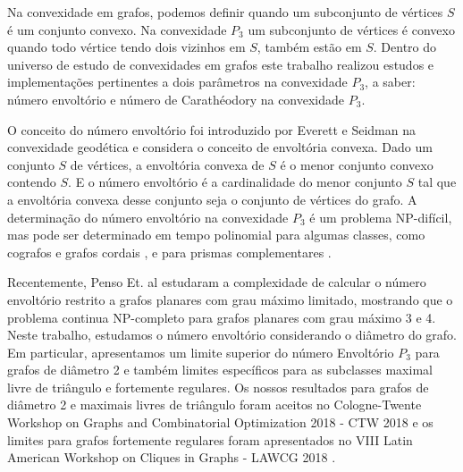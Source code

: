 Na convexidade em grafos, podemos definir quando um subconjunto de vértices $S$ é um conjunto convexo. Na convexidade $P_3$ um subconjunto de vértices é convexo quando todo vértice tendo dois vizinhos em $S$, também estão em $S$. Dentro do universo de estudo de convexidades em grafos este trabalho realizou estudos e implementações pertinentes a dois parâmetros na convexidade $P_3$, a saber: número envoltório e número de Carathéodory na convexidade $P_3$.

O conceito do número envoltório foi introduzido por Everett e Seidman \cite{everett1985hull} na convexidade geodética e considera o conceito de envoltória convexa. Dado um conjunto $S$ de vértices, a envoltória convexa de $S$ é o menor conjunto convexo contendo $S$. E o número envoltório é a cardinalidade do menor conjunto $S$ tal que a envoltória convexa desse conjunto seja o conjunto de vértices do grafo. 
A determinação do número envoltório na convexidade $P_3$ é um problema NP-difícil, mas pode ser determinado em tempo polinomial para algumas classes, como cografos e grafos cordais \cite{Centeno}, e para prismas complementares \cite{duarte2015complexity}.

Recentemente, Penso Et. al\cite{Penso2015} estudaram a complexidade de calcular o número envoltório restrito a grafos planares com grau máximo limitado, mostrando que o problema continua NP-completo para grafos planares com grau máximo 3 e 4. Neste trabalho, estudamos o número envoltório considerando o diâmetro do grafo. Em particular, apresentamos um limite superior do número Envoltório $P_3$ para grafos de diâmetro 2 e também limites específicos para as subclasses maximal livre de triângulo e fortemente regulares. Os nossos resultados para grafos de diâmetro 2 e maximais livres de triângulo foram aceitos no Cologne-Twente Workshop on Graphs and Combinatorial Optimization 2018 - CTW 2018 e os limites para grafos fortemente regulares foram apresentados no VIII Latin American Workshop on Cliques in Graphs - LAWCG 2018 \cite{Coelho2018}.

